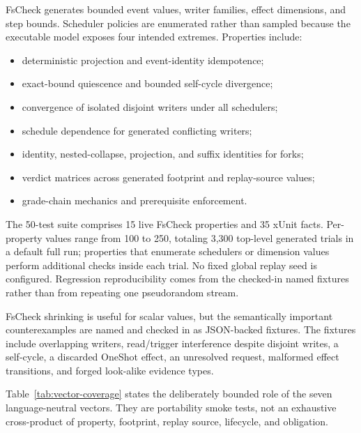 FsCheck generates bounded event values, writer families, effect dimensions,
and step bounds.  Scheduler policies are enumerated rather than sampled because
the executable model exposes four intended extremes.  Properties include:

\begin{itemize}[leftmargin=*]
  \item deterministic projection and event-identity idempotence;
  \item exact-bound quiescence and bounded self-cycle divergence;
  \item convergence of isolated disjoint writers under all schedulers;
  \item schedule dependence for generated conflicting writers;
  \item identity, nested-collapse, projection, and suffix identities for forks;
  \item verdict matrices across generated footprint and replay-source values;
  \item grade-chain mechanics and prerequisite enforcement.
\end{itemize}

The 50-test suite comprises 15 live FsCheck properties and 35 xUnit facts.
Per-property  values range from 100 to 250, totaling 3,300
top-level generated trials in a default full run; properties that enumerate
schedulers or dimension values perform additional checks inside each trial.
No fixed global replay seed is configured.  Regression reproducibility comes
from the checked-in named fixtures rather than from repeating one pseudorandom
stream.

FsCheck shrinking is useful for scalar values, but the semantically important
counterexamples are named and checked in as JSON-backed fixtures.  The fixtures
include overlapping writers, read/trigger interference despite disjoint writes,
a self-cycle, a discarded OneShot effect, an unresolved request, malformed
effect transitions, and forged look-alike evidence types.

Table~\ref{tab:vector-coverage} states the deliberately bounded role of the
seven language-neutral vectors.  They are portability smoke tests, not an
exhaustive cross-product of property, footprint, replay source, lifecycle, and
obligation.

